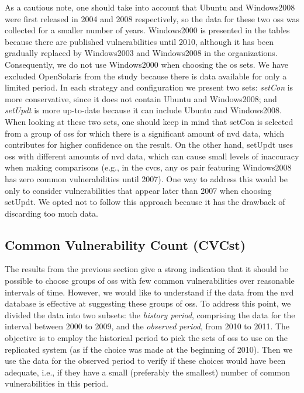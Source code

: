As a cautious note, one should take into account that Ubuntu and Windows2008 were first released in 2004 and 2008 respectively, so the data for these two \glspl{os} was collected for a smaller number of years. 
Windows2000 is presented in the tables because there are published vulnerabilities until 2010, although it has been gradually replaced by Windows2003 and Windows2008 in the organizations. Consequently, we do not use Windows2000 when choosing the \gls{os} sets. 
We have excluded OpenSolaris from the study because there is data available for only a limited period. 
In each strategy and configuration we present two sets: \emph{setCon} is more conservative, since it does not contain Ubuntu and Windows2008; and \emph{setUpdt} is more up-to-date because it can include Ubuntu and Windows2008. 
When looking at these two sets, one should keep in mind that setCon is selected from a group of \glspl{os} for which there is a significant amount of \gls{nvd} data, which contributes for higher confidence on the result. 
On the other hand, setUpdt uses \glspl{os} with different amounts of \gls{nvd} data, which can cause small levels of inaccuracy when making comparisons (e.g., in the \gls{cvcs}, any \gls{os} pair featuring Windows2008 has zero common vulnerabilities until 2007). 
One way to address this would be only to consider vulnerabilities that appear later than 2007 when choosing setUpdt. 
We opted not to follow this approach because it has the drawback of discarding too much data.


\subsection{Common Vulnerability Count (CVCst)} 

The results from the previous section give a strong indication that it should be possible to choose groups of \glspl{os} with few common vulnerabilities over reasonable intervals of time. 
However, we would like to understand if the data from the \gls{nvd} database is effective at suggesting these groups of \glspl{os}. 
To address this point, we divided the data into two subsets: the \emph{history period}, comprising the data for the interval between 2000 to 2009, and the \emph{observed period}, from 2010 to 2011. 
The objective is to employ the historical period to pick the sets of \glspl{os} to use on the replicated system (as if the choice was made at the beginning of 2010). Then we use the data for the observed period to verify if these choices would have been adequate, i.e., if they have a small (preferably the smallest) number of common vulnerabilities in this period.


